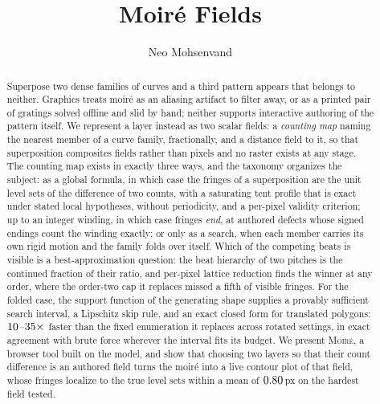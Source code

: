 \documentclass[acmtog, anonymous, review]{acmart}
\theoremstyle{plain}
\theoremstyle{definition}
\newcommand{\Moire}{\textsc{Moir\'e}}
\begin{document}
\title{Moir\'e Fields}

\author{Neo Mohsenvand}
\authorsaddresses{}

\begin{abstract}
Superpose two dense families of curves and a third pattern appears that belongs
to neither. Graphics treats moir\'e as an aliasing artifact to filter away, or
as a printed pair of gratings solved offline and slid by hand; neither supports
interactive authoring of the pattern itself. We represent a layer instead
as two scalar fields: a \emph{counting map} naming the nearest member of a
curve family, fractionally, and a distance field to it, so that superposition
composites fields rather than pixels and no raster exists at any stage. The
counting map exists in exactly three ways, and the taxonomy organizes the
subject: as a global formula, in which case the fringes of a superposition are
the unit level sets of the difference of two counts, with a saturating tent
profile that is exact under stated local hypotheses, without periodicity, and
a per-pixel validity criterion; up to an integer winding, in which case
fringes \emph{end}, at authored defects whose signed endings count the winding
exactly; or only as a search, when each member carries its own rigid motion
and the family folds over itself. Which of the competing beats is visible is a
best-approximation question: the beat hierarchy of two pitches is the
continued fraction of their ratio, and per-pixel lattice reduction finds the
winner at any order, where the order-two cap it replaces missed a fifth of
visible fringes. For the folded case, the support function of the generating
shape supplies a provably sufficient search interval, a Lipschitz skip rule,
and an exact closed form for translated polygons:
$10$--$35\times$ faster than the fixed enumeration it
replaces across rotated settings, in exact agreement with brute force wherever
the interval fits its budget. We present \Moire{}, a browser tool built on the
model, and show that choosing two layers so that their count difference is an
authored field turns the moir\'e into a live contour plot of that field, whose
fringes localize to the true level sets within a mean of
$0.80$\,px on the hardest field tested.
\end{abstract}
\end{document}
